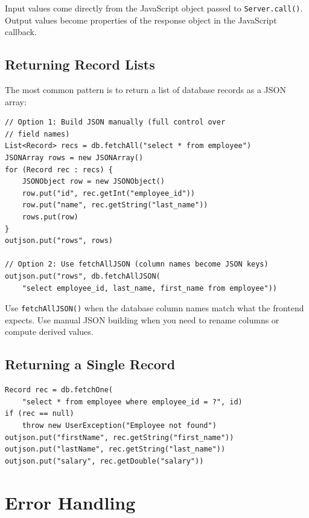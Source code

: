 \noindent
Input values come directly from the JavaScript object passed to \texttt{Server.call()}.  Output values become properties of the response object in the JavaScript callback.

\subsection{Returning Record Lists}

The most common pattern is to return a list of database records as a JSON array:

\begin{lstlisting}[style=groovy]
// Option 1: Build JSON manually (full control over
// field names)
List<Record> recs = db.fetchAll("select * from employee")
JSONArray rows = new JSONArray()
for (Record rec : recs) {
    JSONObject row = new JSONObject()
    row.put("id", rec.getInt("employee_id"))
    row.put("name", rec.getString("last_name"))
    rows.put(row)
}
outjson.put("rows", rows)

// Option 2: Use fetchAllJSON (column names become JSON keys)
outjson.put("rows", db.fetchAllJSON(
    "select employee_id, last_name, first_name from employee"))
\end{lstlisting}

\begin{tipbox}
Use \texttt{fetchAllJSON()} when the database column names match what the frontend expects.  Use manual JSON building when you need to rename columns or compute derived values.
\end{tipbox}

\subsection{Returning a Single Record}

\begin{lstlisting}[style=groovy]
Record rec = db.fetchOne(
    "select * from employee where employee_id = ?", id)
if (rec == null)
    throw new UserException("Employee not found")
outjson.put("firstName", rec.getString("first_name"))
outjson.put("lastName", rec.getString("last_name"))
outjson.put("salary", rec.getDouble("salary"))
\end{lstlisting}

\section{Error Handling}
\label{sec:svc-errors}

